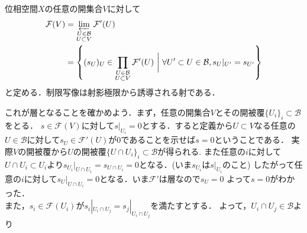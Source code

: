 {%


位相空間$X$の任意の開集合$V$に対して
\begin{align*}
  \mathcal{F}(V)
    & = \varprojlim_{\substack{U\in \mathcal{B}                  \\ U\subset V}}\mathcal{F}'(U)\\
    & = \left\{(s_{U})_{U} \in \prod_{\substack{U\in \mathcal{B} \\ U \subset V}} \mathcal{F}'(U) \ \biggl|\
  \forall U' \subset U \in \mathcal{B}, s_{U}|_{U'}=s_{U'} \right\}
\end{align*}
と定める．制限写像は射影極限から誘導される射である．
\begin{center}
\end{center}
これが層となることを確かめよう．まず，任意の開集合$V$とその開被覆$\{U_{i}\}_{i}\subset \mathcal{B}$をとる．
$s\in \mathcal{F}(V)$に対して$s|_{U_{i}}=0$とする．すると定義から$U\subset V$なる任意の$U\in \mathcal{B}$に対して$s_{U}\in \mathcal{F}'(U)$が$0$であることを示せば$s=0$ということである．
実際$V$の開被覆から$U$の開被覆$\{U \cap U_{i}\}_{i}\subset \mathcal{B}$が得られる.
また任意の$i$に対して$U\cap U_{i} \subset U_{i}$より$s_{U_{i}}|_{U\cap U_{i}} = s_{U\cap U_{i}} = 0$となる．(いま$s_{U_{i}}$は$s|_{U_{i}}$のこと)
したがって任意の$i$に対して$s_{U}|_{U\cap U_{i}} = 0$となる．いま$\mathcal{F}'$は層なので$s_{U}=0$
よって$s=0$がわかった．\\
また，$s_{i} \in \mathcal{F}(U_{i})$が$s_{i}|_{U_{i}\cap U_{j}} = s_{j}|_{U_{i} \cap U_{j}}$を満たすとする．
よって，$U_{i}\cap U_{j} \in \mathcal{B}$より
}{}



